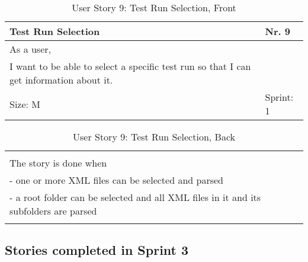 \begin{table}[H]
  \caption{User Story 9: Test Run Selection, Front}
  \label{Story_9_Front}
  \centering
  \begin{tabular}{|p{9cm} p{2cm}|}
	\hline  	
  	Test Run Selection & Nr. 9 \\ 
  	\hline
  	As a user, &    \\ 
  	I want to be able to select a specific test run so that I can get information about it. &    \\ 
  	Size: M & Sprint: 1 \\ 
  	\hline
  \end{tabular}
\end{table}
\begin{table}[H]
  \caption{User Story 9: Test Run Selection, Back}
  \label{Story_2_Back}
  \centering
  \begin{tabular}{|p{10cm} p{1cm}|}
  \hline
  	  &    \\ 
  	The story is done when &    \\ 
  	 - one or more XML files can be selected and parsed & \\ 
  	 - a root folder can be selected and all XML files in it and its subfolders are parsed & \\  
  	 
  	  &  
  	   \\ 
  	\hline
  \end{tabular}
\end{table}

\subsection*{Stories completed in Sprint 3}

